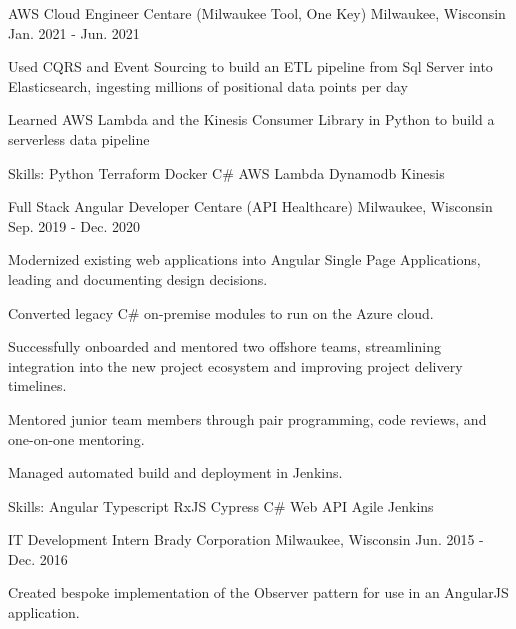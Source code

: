 \begin{cventries}
  \cventry
    {AWS Cloud Engineer} %
    {Centare (Milwaukee Tool, One Key)} %
    {Milwaukee, Wisconsin} %
    {Jan. 2021 - Jun. 2021} %
    {
      \begin{cvitems} %
        \item {Used CQRS and Event Sourcing to build an ETL pipeline from Sql Server into Elasticsearch, ingesting millions of positional data points per day }
        \item {Learned AWS Lambda and the Kinesis Consumer Library in Python to build a serverless data pipeline}
        \item {Skills: Python \textbullet{} Terraform \textbullet{} Docker \textbullet{} C\# \textbullet{} AWS Lambda \textbullet{} Dynamodb \textbullet{} Kinesis}
      \end{cvitems}
    }

  \cventry
    {Full Stack Angular Developer} %
    {Centare (API Healthcare)} %
    {Milwaukee, Wisconsin} %
    {Sep. 2019 - Dec. 2020} %
    {
      \begin{cvitems} %
        \item {Modernized existing web applications into Angular Single Page Applications, leading and documenting design decisions.}
        \item {Converted legacy C\# on-premise modules to run on the Azure cloud.}
        \item {Successfully onboarded and mentored two offshore teams, streamlining integration into the new project ecosystem and improving project delivery timelines.}
        \item {Mentored junior team members through pair programming, code reviews, and one-on-one mentoring.}
        \item {Managed automated build and deployment in Jenkins.}
        \item {Skills: Angular \textbullet{} Typescript \textbullet{} RxJS \textbullet{} Cypress \textbullet{} C\# Web API \textbullet{} Agile \textbullet{} Jenkins}
      \end{cvitems}
    }

  \cventry
    {IT Development Intern} %
    {Brady Corporation} %
    {Milwaukee, Wisconsin} %
    {Jun. 2015 - Dec. 2016} %
    {
      \begin{cvitems} %
        \item {Created bespoke implementation of the Observer pattern for use in an AngularJS application.}
      \end{cvitems}
    }


\end{cventries}
